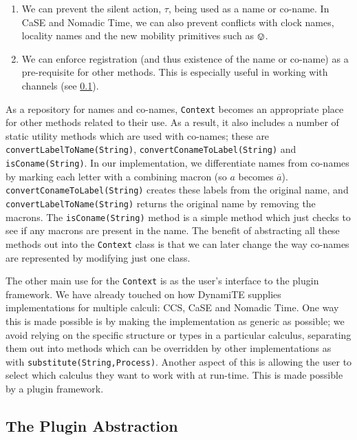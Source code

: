 \begin{enumerate}
\item We can prevent the silent action, $\tau$, being used as a name
  or co-name.  In CaSE and Nomadic Time, we can also prevent conflicts
  with clock names, locality names and the new mobility primitives
  such as $\tntin$.
\item We can enforce registration (and thus existence of the name or
  co-name) as a pre-requisite for other methods.  This is especially
  useful in working with channels (see \ref{dyn:plugin}).
\end{enumerate}

As a repository for names and co-names, \texttt{Context} becomes an
appropriate place for other methods related to their use.  As a
result, it also includes a number of static utility methods which are
used with co-names; these are \texttt{convertLabelToName(String)},
\texttt{convertConameToLabel(String)} and \texttt{isConame(String)}.
In our implementation, we differentiate names from co-names by marking
each letter with a combining macron (so $a$ becomes $\overline{a}$).
\texttt{convertConameToLabel(String)} creates these labels from the
original name, and \texttt{convertLabelToName(String)} returns the
original name by removing the macrons.  The \texttt{isConame(String)}
method is a simple method which just checks to see if any macrons are
present in the name.  The benefit of abstracting all these methods out
into the \texttt{Context} class is that we can later change the way
co-names are represented by modifying just one class.

The other main use for the \texttt{Context} is as the user's interface
to the plugin framework.  We have already touched on how DynamiTE
supplies implementations for multiple calculi: CCS, CaSE and Nomadic
Time.  One way this is made possible is by making the implementation
as generic as possible; we avoid relying on the specific structure or
types in a particular calculus, separating them out into methods which
can be overridden by other implementations as with
\texttt{substitute(String,Process)}.  Another aspect of this is
allowing the user to select which calculus they want to work with at
run-time.  This is made possible by a plugin framework.

\subsection{The Plugin Abstraction}
\label{dyn:plugin}

